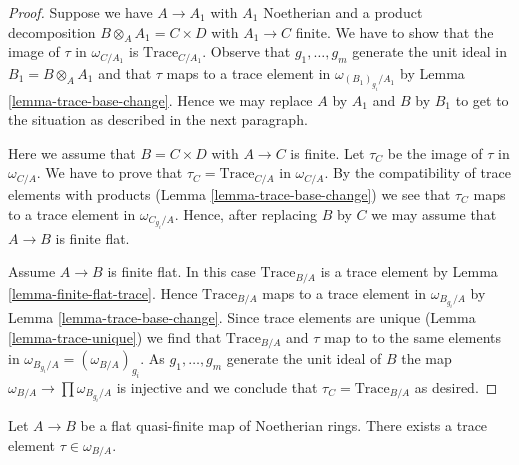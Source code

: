 \begin{proof}
Suppose we have $A \to A_1$ with $A_1$ Noetherian and a product
decomposition $B \otimes_A A_1 = C \times D$ with $A_1 \to C$ finite.
We have to show that the image of $\tau$ in $\omega_{C/A_1}$ is
$\text{Trace}_{C/A_1}$. Observe that $g_1, \ldots, g_m$
generate the unit ideal in $B_1 = B \otimes_A A_1$ and that
$\tau$ maps to a trace element in $\omega_{(B_1)_{g_i}/A_1}$
by Lemma \ref{lemma-trace-base-change}. Hence we may replace
$A$ by $A_1$ and $B$ by $B_1$ to get to the situation as described
in the next paragraph.

\medskip\noindent
Here we assume that $B = C \times D$ with $A \to C$ is finite.
Let $\tau_C$ be the image of $\tau$ in $\omega_{C/A}$.
We have to prove that $\tau_C = \text{Trace}_{C/A}$ in $\omega_{C/A}$.
By the compatibility of trace elements with products
(Lemma \ref{lemma-trace-base-change})
we see that $\tau_C$ maps to a trace element in $\omega_{C_{g_i}/A}$.
Hence, after replacing $B$ by $C$ we may assume that $A \to B$
is finite flat.

\medskip\noindent
Assume $A \to B$ is finite flat. In this case $\text{Trace}_{B/A}$
is a trace element by Lemma \ref{lemma-finite-flat-trace}.
Hence $\text{Trace}_{B/A}$ maps to a trace element in
$\omega_{B_{g_i}/A}$ by Lemma \ref{lemma-trace-base-change}.
Since trace elements are unique (Lemma \ref{lemma-trace-unique})
we find that $\text{Trace}_{B/A}$ and $\tau$ map to
to the same elements in $\omega_{B_{g_i}/A} = (\omega_{B/A})_{g_i}$.
As $g_1, \ldots, g_m$ generate the unit ideal of $B$ the map
$\omega_{B/A} \to \prod \omega_{B_{g_i}/A}$ is injective
and we conclude that $\tau_C = \text{Trace}_{B/A}$ as desired.
\end{proof}

\begin{lemma}
\label{lemma-dualizing-tau}
Let $A \to B$ be a flat quasi-finite map of Noetherian rings.
There exists a trace element $\tau \in \omega_{B/A}$.
\end{lemma}

